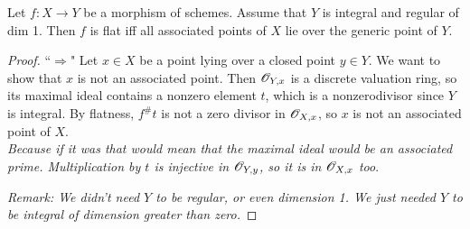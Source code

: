 \begin{proposition} Let $f:X\rightarrow Y$ be a morphism of
schemes. Assume that $Y$ is integral and regular of dim 1. Then
$f$ is flat iff all associated points of $X$ lie over the generic
point of $Y$. \end{proposition} \begin{proof} ``$\Rightarrow$" Let
$x \in X$ be a point lying over a closed point $y \in Y$. We want
to show that $x$ is not an associated point. Then $\mathscr{O}_{Y,x}$ is a
discrete valuation ring, so its maximal ideal contains a nonzero
element $t$, which is a nonzerodivisor since $Y$ is integral. By
flatness, $f^{\#}t$ is not a zero divisor in
$\mathscr{O}_{X,x}$, so $x$ is not an associated point of $X$.\\

\emph{Because if it was that would mean that the maximal ideal
would be an associated prime. Multiplication by $t$ is injective
in $\mathscr{O}_{Y,y}$, so it is in $\mathscr{O}_{X,x}$ too}.

\emph{Remark: We didn't need $Y$ to be regular, or even dimension
1. We just needed $Y$ to be integral of dimension greater than
zero.} \end{proof}
